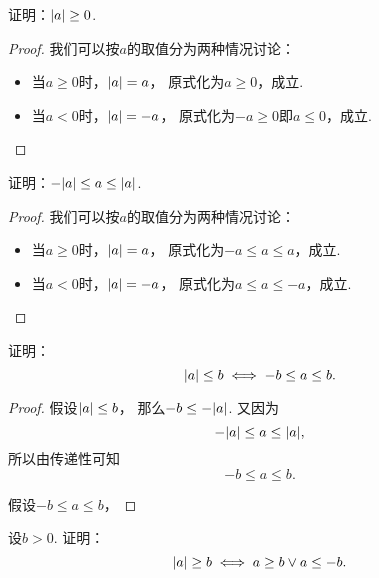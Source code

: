 \begin{example}
证明：\(\abs{a} \geq 0\).
\begin{proof}
我们可以按\(a\)的取值分为两种情况讨论：
\begin{itemize}
	\item 当\(a \geq 0\)时，\(\abs{a}=a\)，
	原式化为\(a \geq 0\)，成立.
	\item 当\(a < 0\)时，\(\abs{a}=-a\)，
	原式化为\(-a \geq 0\)即\(a \leq 0\)，成立.
	\qedhere
\end{itemize}
\end{proof}
\end{example}
\begin{example}
证明：\(-\abs{a} \leq a \leq \abs{a}\).
\begin{proof}
我们可以按\(a\)的取值分为两种情况讨论：
\begin{itemize}
	\item 当\(a \geq 0\)时，\(\abs{a}=a\)，
	原式化为\(-a \leq a \leq a\)，成立.
	\item 当\(a < 0\)时，\(\abs{a}=-a\)，
	原式化为\(a \leq a \leq -a\)，成立.
	\qedhere
\end{itemize}
\end{proof}
\end{example}
\begin{example}
证明：\[
	\abs{a} \leq b
	\iff
	-b \leq a \leq b.
\]
\begin{proof}
假设\(\abs{a} \leq b\)，
那么\(-b \leq -\abs{a}\).
又因为\[
	-\abs{a} \leq a \leq \abs{a},
\]
所以由传递性可知\[
	-b \leq a \leq b.
\]

假设\(-b \leq a \leq b\)，
\end{proof}
\end{example}
\begin{example}
设\(b>0\).
证明：\[
	\abs{a} \geq b
	\iff
	a \geq b \lor a \leq -b.
\]
\end{example}
